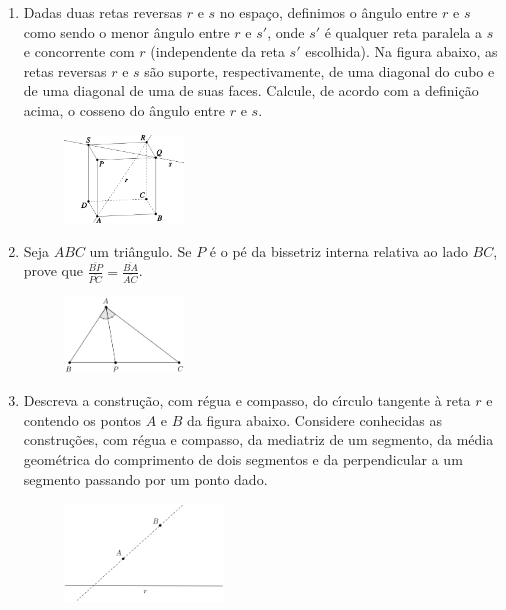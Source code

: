 \documentclass[a4paper,5pt]{amsbook}
\newcommand{\ds}{\displaystyle}
\begin{document}
\begin{enumerate}
    \item Dadas duas retas reversas $r$ e $s$ no espa\c{c}o, definimos o \^angulo
        entre $r$ e $s$ como sendo o menor \^angulo entre $r$ e $s'$, onde $s'$ \'e
        qualquer reta paralela a $s$ e concorrente com $r$ (independente da
        reta $s'$ escolhida). Na figura abaixo, as retas reversas $r$ e $s$ s\~ao
        suporte, respectivamente, de uma diagonal do cubo e de uma diagonal de
        uma de suas faces. Calcule, de acordo com a defini\c{c}\~ao acima, o cosseno
        do \^angulo entre $r$ e $s$.
        \begin{figure}[h]
            \centering
            \includegraphics[width=0.3\textwidth]{fig01-4.pdf}
        \end{figure}
    \vspace{1cm}

    \item Seja $ABC$ um tri\^angulo. Se $P$ \'e o p\'e da bissetriz interna relativa
        ao lado $BC$, prove que $\ds\frac{\overline{BP}}{\overline{PC}} =
        \frac{\overline{BA}}{\overline{AC}}$.
        \begin{figure}[!h]
            \centering
            \includegraphics[width=0.3\textwidth]{fig01-5.png}
        \end{figure}

    \item Descreva a constru\c{c}\~ao, com r\'egua e compasso, do c\'{\i}rculo tangente \`a
        reta $r$ e contendo os pontos $A$ e $B$ da figura abaixo. Considere
        conhecidas as constru\c{c}\~oes, com r\'egua e compasso, da mediatriz de um
        segmento, da m\'edia geom\'etrica do comprimento de dois segmentos e da
        perpendicular a um segmento passando por um ponto dado.
        \begin{figure}[!h]
            \centering
            \includegraphics[width=0.4\textwidth]{fig01-1.png}
        \end{figure}
\end{enumerate}
\end{document}
